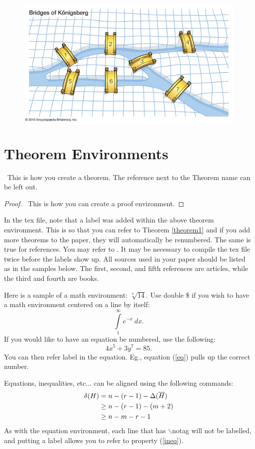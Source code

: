 \documentclass[10pt]{amsart}
\begin{document}
\begin{figure}[h!]
\centerline{
{\includegraphics[width=.7\textwidth]{pictures/bridge_pic.png}}}\label{bridge}
\end{figure} 

\section{Theorem Environments}

\begin{theorem}[Ramsey, 1930] \ This is how you create a theorem. The reference next to the Theorem name can be left out.  \label{theorem1}
\end{theorem}

\begin{proof} \ This is how you can create a proof environment.  \end{proof}

In the tex file, note that a label was added within the above theorem environment.  This is so that you can refer to Theorem \ref{theorem1} and if you add more theorems to the paper, they will automatically be renumbered.  The same is true for references.  You may refer to \cite{R}.  It may be necessary to compile the tex file twice before the labels show up.  All sources used in your paper should be listed as in the samples below.  The first, second, and fifth references are articles, while the third and fourth are books.

Here is a sample of a math environment: $\sqrt[4]{14}$.  Use double $\$$ if you wish to have a math environment centered on a line by itself:
$$\mathop{\int}\limits_{1}^{\infty} e^{-x} \ dx.$$
If you would like to have an equation be numbered, use the following:
\begin{equation}  4x^5+3y^7=85. \label{eq} \end{equation}
You can then refer label in the equation.  Eg., equation (\ref{eq}) pulls up the correct number.

Equations, inequalities, etc... can be aligned using the following commands:
\begin{align} \delta (H) &= n-(r-1)-\Delta (\overline{H}) \notag \\
                                    &\ge n-(r-1)-(m+2) \notag \\
                                    &\ge n-m-r-1 \label{ineq} \end{align}
As with the equation environment, each line that has $\backslash$notag will not be labelled, and putting a label allows you to refer to property (\ref{ineq}).
\end{document}
